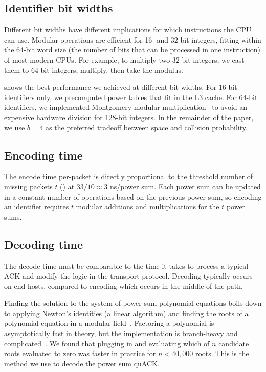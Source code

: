 \subsection{Identifier bit widths}
\label{sec:quack:psum-microbenchmarks:bit-widths}

Different bit widths have different implications for
which instructions the CPU can use. Modular operations are efficient
for 16- and 32-bit integers, fitting within the 64-bit word size (the number of
bits that can be processed in one instruction) of most modern CPUs. For example,
to multiply two 32-bit integers, we cast them to 64-bit integers, multiply,
then take the modulus.

 shows the best performance we achieved at different bit
widths. For 16-bit identifiers only, we precomputed power tables that fit in
the L3 cache. For 64-bit identifiers, we implemented Montgomery modular
multiplication~\cite{montgomery1985modular} to avoid an expensive hardware
division for 128-bit integers. In the remainder of the paper, we use $b=4$ as
the preferred tradeoff between space and collision probability.

\subsection{Encoding time}
\label{sec:quack:psum-microbenchmarks:encoding}

The encode time per-packet is directly proportional to
the threshold number of missing packets $t$ () at
$33/10 \approx 3$ ns/power sum.
Each power sum can be updated in a constant number of operations based on the
previous power sum, so encoding an identifier requires $t$ modular additions
and multiplications for the $t$ power sums.

\subsection{Decoding time}
\label{sec:quack:psum-microbenchmarks:decoding}

The decode time must be comparable to the time it takes to process a typical
ACK and modify the logic in the transport protocol. Decoding typically
occurs on end hosts, compared to encoding which occurs in the middle of the path.

Finding the solution to the system of power sum polynomial equations boils down
to applying Newton's identities (a linear algorithm) and finding the roots of a
polynomial equation
in a modular field~\cite{eppstein2011straggler}.
Factoring a polynomial is asymptotically fast in theory, but the implementation
is branch-heavy and complicated~\cite{batut2000user}.
We found that plugging in and evaluating which of $n$ candidate roots
evaluated to zero was faster in practice for $n < 40,000$ roots.
This is the method we use to decode the power sum quACK.

